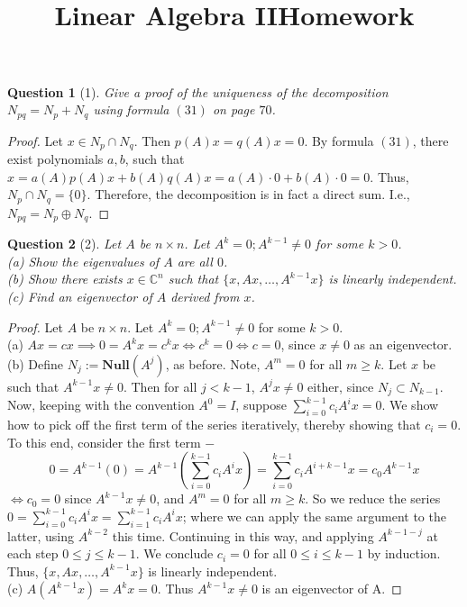 \documentclass[11pt]{article}
\title{\vspace{-50pt}
\Huge \name
\\\vspace{20pt}
\huge Linear Algebra II\hfill Homework \hw}
\author{}
\date{}
\theoremstyle{quest}
\newtheorem*{question}{Question}
\begin{document}
\maketitle

\begin{question}[1]
Give a proof of the uniqueness of the decomposition $N_{pq} = N_p + N_q$ using formula $(31)$ on page $70$.
\end{question}
\begin{proof}
Let $x \in N_p \cap N_q$. Then $p(A)x = q(A)x = 0$. By formula $(31)$, there exist polynomials $a, b$, such that $x = a(A)p(A)x + b(A)q(A)x = a(A) \cdot 0 + b(A) \cdot 0 = 0$. Thus, $N_p \cap N_q = \{0\}$. Therefore, the decomposition is in fact a direct sum. I.e., $N_{pq} = N_p \oplus N_q$.
\end{proof}
\begin{question}[2]
Let $A$ be $n \times n$. Let $A^k = 0; A^{k-1} \ne 0$ for some $k > 0$.
\\(a) Show the eigenvalues of $A$ are all $0$.
\\(b) Show there exists $x \in \mathbb{C}^n$ such that $\{x, Ax, \ldots, A^{k-1}x\}$ is linearly independent.
\\(c) Find an eigenvector of $A$ derived from $x$.
\end{question}
\begin{proof}
Let $A$ be $n \times n$. Let $A^k = 0; A^{k-1} \ne 0$ for some $k > 0$.
\\(a) $Ax = cx \implies 0 = A^k x = c^k x \iff c^k = 0 \iff c = 0$, since $x \ne 0$ as an eigenvector.
\\ (b) Define $N_j := \mathbf{Null}(A^j)$, as before. Note, $A^m = 0$ for all $m \ge k$. Let $x$ be such that $A^{k-1}x \ne 0$. Then for all $j < k-1$, $A^j x \ne 0$ either, since $N_j \subset N_{k-1}$. Now, keeping with the convention $A^0 = I$, suppose $\sum_{i = 0}^{k-1} c_i A^i x = 0$. We show how to pick off the first term of the series iteratively, thereby showing that $c_i = 0$. To this end, consider the first term $-$
$$0 = A^{k-1}(0) = A^{k-1}(\sum_{i = 0}^{k-1} c_i A^i x) = \sum_{i = 0}^{k-1} c_i A^{i+k-1} x = c_0 A^{k-1} x$$
$\iff c_0 = 0$ since $A^{k-1}x \ne 0$, and $A^m = 0$ for all $m \ge k$. So we reduce the series $0 = \sum_{i = 0}^{k-1} c_i A^i x = \sum_{i = 1}^{k-1} c_i A^i x$; where we can apply the same argument to the latter, using $A^{k-2}$ this time. Continuing in this way, and applying $A^{k-1-j}$ at each step $ 0 \le j \le k-1$. We conclude $c_i = 0$ for all $ 0 \le i \le k-1$ by induction. Thus, $\{x, Ax, \ldots, A^{k-1}x\}$ is linearly independent.
\\(c) $A(A^{k-1} x) = A^k x = 0$. Thus $A^{k-1} x \ne 0$ is an eigenvector of A.
\end{proof}
\end{document}
